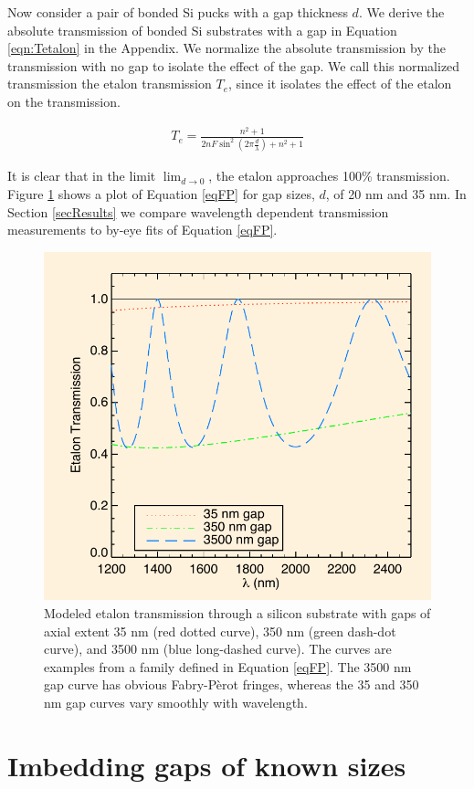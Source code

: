 \documentclass[osajnl,preprint,showpacs,superscriptaddress,12pt]{revtex4-1} %
\begin{document}
Now consider a pair of bonded Si pucks with a gap thickness $d$. We derive the absolute transmission of bonded Si substrates with a gap in Equation \ref{eqn:Tetalon} in the Appendix.  We normalize the absolute transmission by the transmission with no gap to isolate the effect of the gap.  We call this normalized transmission the etalon transmission $T_{e}$, since it isolates the effect of the etalon on the transmission.

\begin{eqnarray}
T_{e} = \frac{n^2+1}{2 n F \sin ^2(2\pi \frac{d}{\lambda})+n^2+1} \label{eqFP}
\end{eqnarray}

It is clear that in the limit $\lim_{d \rightarrow 0}$, the etalon approaches 100\% transmission.  Figure \ref{figEtalonRelTrans} shows a plot of Equation \ref{eqFP} for gap sizes, $d$, of 20 nm and 35 nm.  In Section \ref{secResults} we compare wavelength dependent transmission measurements to by-eye fits of Equation \ref{eqFP}.  

\begin{figure}[htbp]
\centerline{\includegraphics[width=0.65\columnwidth]{figs/20140421_absoluteC.pdf}}
\caption{Modeled etalon transmission through a silicon substrate with gaps of axial extent 35 nm (red dotted curve), 350 nm (green dash-dot curve), and 3500 nm (blue long-dashed curve)\label{figEtalonRelTrans}.  The curves are examples from a family defined in Equation \ref{eqFP}.  The 3500 nm gap curve has obvious Fabry-P\`erot fringes, whereas the 35 and 350 nm gap curves vary smoothly with wavelength.} 
\end{figure}

\section{Imbedding gaps of known sizes}
\end{document}
